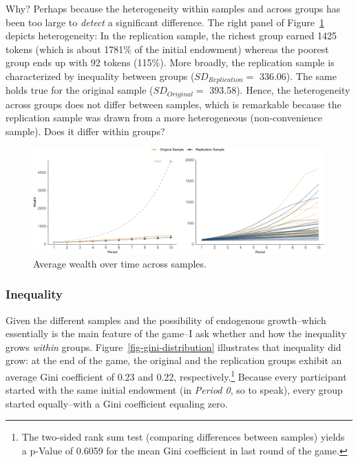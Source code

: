 \documentclass[
  authoryear,
  preprint,
  3p]{elsarticle}
\begin{document}
Why? Perhaps because the heterogeneity within samples and across groups
has been too large to \emph{detect} a significant difference. The right
panel of Figure~\ref{fig-growth-heterogeneity} depicts heterogeneity: In
the replication sample, the richest group earned 1425 tokens (which is
about 1781\% of the initial endowment) whereas the poorest group ends up
with 92 tokens (115\%). More broadly, the replication sample is
characterized by inequality between groups (\(SD_{Replication} =\)
336.06). The same holds true for the original sample
(\(SD_{Original} =\) 393.58). Hence, the heterogeneity across groups
does not differ between samples, which is remarkable because the
replication sample was drawn from a more heterogeneous (non-convenience
sample). Does it differ within groups?

\begin{figure}

{\centering \includegraphics{paper_files/figure-pdf/fig-growth-heterogeneity-1.pdf}

}

\caption{\label{fig-growth-heterogeneity}Average wealth over time across
samples.}

\end{figure}

\hypertarget{sec-inequality}{%
\subsubsection{Inequality}\label{sec-inequality}}

Given the different samples and the possibility of endogenous
growth--which essentially is the main feature of the game--I ask whether
and how the inequality grows \emph{within} groups.
Figure~\ref{fig-gini-distribution} illustrates that inequality did grow:
at the end of the game, the original and the replication groups exhibit
an average Gini coefficient of 0.23 and 0.22, respectively.\footnote{The
  two-sided rank sum test (comparing differences between samples) yields
  a p-Value of 0.6059 for the mean Gini coefficient in last round of the
  game.} Because every participant started with the same initial
endowment (in \emph{Period 0}, so to speak), every group started
equally--with a Gini coefficient equaling zero.
\end{document}
